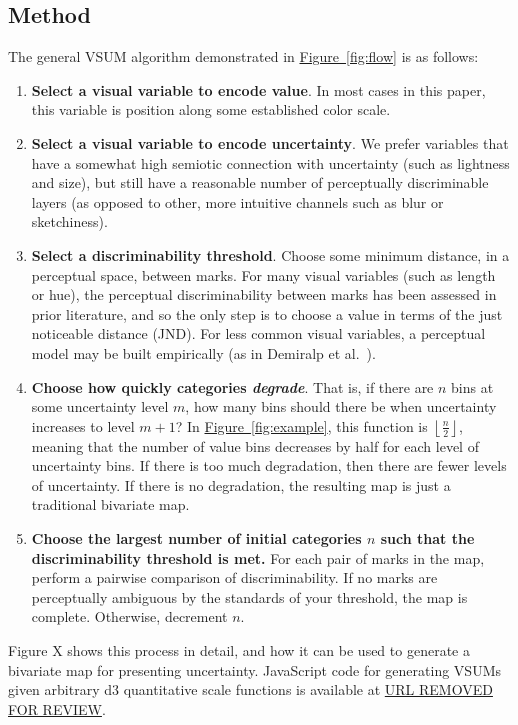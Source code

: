 \documentclass{vgtc}                          %
\newcommand{\figref}[1]{\hyperref[#1]{Figure~\ref*{#1}}}
\begin{document}
\subsection{Method}

\flowFig

The general VSUM algorithm demonstrated in \figref{fig:flow} is as follows:

\begin{enumerate}
	\item \textbf{Select a visual variable to encode value}. In most cases in this paper, this variable is position along some established color scale.
	\item \textbf{Select a visual variable to encode uncertainty}. We prefer variables that have a somewhat high semiotic connection with uncertainty (such as lightness and size), but still have a reasonable number of perceptually discriminable layers (as opposed to other, more intuitive channels such as blur or sketchiness).
	\item \textbf{Select a discriminability threshold}. Choose some minimum distance, in a perceptual space, between marks. For many visual variables (such as length or hue), the perceptual discriminability between marks has been assessed in prior literature, and so the only step is to choose a value in terms of the just noticeable distance (JND). For less common visual variables, a perceptual model may be built empirically (as in Demiralp et al.~\cite{demiralp2014learning}).
	\item \textbf{Choose how quickly categories \emph{degrade}}. That is, if there are $n$ bins at some uncertainty level $m$, how many bins should there be when uncertainty increases to level $m+1$? In \figref{fig:example}, this function is $\left \lfloor {\frac{n}{2}}\right \rfloor$, meaning that the number of value bins decreases by half for each level of uncertainty bins. If there is too much degradation, then there are fewer levels of uncertainty. If there is no degradation, the resulting map is just a traditional bivariate map.
	\item \textbf{Choose the largest number of initial categories $n$ such that the discriminability threshold is met.} For each pair of marks in the map, perform a pairwise comparison of discriminability. If no marks are perceptually ambiguous by the standards of your threshold, the map is complete. Otherwise, decrement $n$.
\end{enumerate}

Figure X shows this process in detail, and how it can be used to generate a bivariate map for presenting uncertainty. JavaScript code for generating VSUMs given arbitrary d3 quantitative scale functions is available at \url{URL REMOVED FOR REVIEW}.
\end{document}
